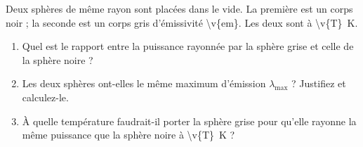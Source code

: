 Deux sphères de même rayon sont placées dans le vide. La première est un corps noir ; la seconde est un corps gris d'émissivité \num{\v{em}}. Les deux sont à \qty{\v{T}}{K}.

\begin{enumerate}[label=\alph*)]
    \item Quel est le rapport entre la puissance rayonnée par la sphère grise et celle de la sphère noire ?
    \item Les deux sphères ont-elles le même maximum d'émission $\lambda_{\max}$ ? Justifiez et calculez-le.
    \item À quelle température faudrait-il porter la sphère grise pour qu'elle rayonne la même puissance que la sphère noire à \qty{\v{T}}{K} ?
\end{enumerate}
